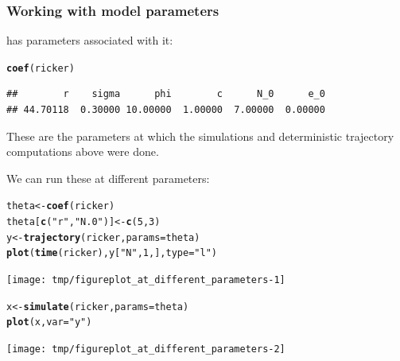 \documentclass{beamer}\usepackage[]{graphicx}\usepackage[]{color}
\makeatletter
\newcommand{\hlnum}[1]{\textcolor[rgb]{0.686,0.059,0.569}{#1}}%
\newcommand{\hlstr}[1]{\textcolor[rgb]{0.192,0.494,0.8}{#1}}%
\newcommand{\hlstd}[1]{\textcolor[rgb]{0.345,0.345,0.345}{#1}}%
\newcommand{\hlkwb}[1]{\textcolor[rgb]{0.69,0.353,0.396}{#1}}%
\newcommand{\hlkwc}[1]{\textcolor[rgb]{0.333,0.667,0.333}{#1}}%
\newcommand{\hlkwd}[1]{\textcolor[rgb]{0.737,0.353,0.396}{\textbf{#1}}}%
\newenvironment{kframe}{%
 \def\at@end@of@kframe{}%
 \ifinner\ifhmode%
  \def\at@end@of@kframe{\end{minipage}}%
  \begin{minipage}{\columnwidth}%
 \fi\fi%
 \def\FrameCommand##1{\hskip\@totalleftmargin \hskip-\fboxsep
 \colorbox{shadecolor}{##1}\hskip-\fboxsep
     \hskip-\linewidth \hskip-\@totalleftmargin \hskip\columnwidth}%
 \MakeFramed {\advance\hsize-\width
   \@totalleftmargin\z@ \linewidth\hsize
   \@setminipage}}%
 {\par\unskip\endMakeFramed%
 \at@end@of@kframe}
\newenvironment{knitrout}{}{} %
\makeatother
\begin{document}
\begin{frame}
\frametitle{Working with model parameters}
\bi
\item {} has parameters associated with it:
\ei
\begin{knitrout}\small
{}\color{fgcolor}\begin{kframe}
\begin{alltt}
\hlkwd{coef}\hlstd{(ricker)}
\end{alltt}
\begin{verbatim}
##        r    sigma      phi        c      N_0      e_0 
## 44.70118  0.30000 10.00000  1.00000  7.00000  0.00000
\end{verbatim}
\end{kframe}
\end{knitrout}
\bi
\item These are the parameters at which the simulations and deterministic trajectory computations above were done.

\item We can run these at different parameters:
\ei
\begin{knitrout}\small
{}\color{fgcolor}\begin{kframe}
\begin{alltt}
\hlstd{theta} \hlkwb{<-} \hlkwd{coef}\hlstd{(ricker)}
\hlstd{theta[}\hlkwd{c}\hlstd{(}\hlstr{"r"}\hlstd{,}\hlstr{"N.0"}\hlstd{)]} \hlkwb{<-} \hlkwd{c}\hlstd{(}\hlnum{5}\hlstd{,}\hlnum{3}\hlstd{)}
\hlstd{y} \hlkwb{<-} \hlkwd{trajectory}\hlstd{(ricker,}\hlkwc{params}\hlstd{=theta)}
\hlkwd{plot}\hlstd{(}\hlkwd{time}\hlstd{(ricker),y[}\hlstr{"N"}\hlstd{,}\hlnum{1}\hlstd{,],}\hlkwc{type}\hlstd{=}\hlstr{"l"}\hlstd{)}
\end{alltt}
\end{kframe}

{\centering \texttt{[image: tmp/figureplot\_at\_different\_parameters-1]} 

}


\begin{kframe}\begin{alltt}
\hlstd{x} \hlkwb{<-} \hlkwd{simulate}\hlstd{(ricker,}\hlkwc{params}\hlstd{=theta)}
\hlkwd{plot}\hlstd{(x,}\hlkwc{var}\hlstd{=}\hlstr{"y"}\hlstd{)}
\end{alltt}
\end{kframe}

{\centering \texttt{[image: tmp/figureplot\_at\_different\_parameters-2]} 

}



\end{knitrout}

\end{frame}
\end{document}
